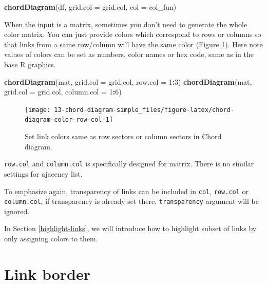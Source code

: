 \documentclass[]{book}
\newenvironment{Shaded}{\begin{snugshade}}{\end{snugshade}}
\newcommand{\KeywordTok}[1]{\textcolor[rgb]{0.13,0.29,0.53}{\textbf{#1}}}
\newcommand{\DataTypeTok}[1]{\textcolor[rgb]{0.13,0.29,0.53}{#1}}
\newcommand{\DecValTok}[1]{\textcolor[rgb]{0.00,0.00,0.81}{#1}}
\newcommand{\OperatorTok}[1]{\textcolor[rgb]{0.81,0.36,0.00}{\textbf{#1}}}
\newcommand{\NormalTok}[1]{#1}
\theoremstyle{definition}
\theoremstyle{definition}
\theoremstyle{remark}
\begin{document}
\begin{Shaded}
\begin{Highlighting}[]
\KeywordTok{chordDiagram}\NormalTok{(df, }\DataTypeTok{grid.col =}\NormalTok{ grid.col, }\DataTypeTok{col =}\NormalTok{ col_fun)}
\end{Highlighting}
\end{Shaded}

When the input is a matrix, sometimes you don't need to generate the
whole color matrix. You can just provide colors which correspond to rows
or columns so that links from a same row/column will have the same color
(Figure \ref{fig:chord-diagram-color-row-col}). Here note values of
colors can be set as numbers, color names or hex code, same as in the
base R graphics.

\begin{Shaded}
\begin{Highlighting}[]
\KeywordTok{chordDiagram}\NormalTok{(mat, }\DataTypeTok{grid.col =}\NormalTok{ grid.col, }\DataTypeTok{row.col =} \DecValTok{1}\OperatorTok{:}\DecValTok{3}\NormalTok{)}
\KeywordTok{chordDiagram}\NormalTok{(mat, }\DataTypeTok{grid.col =}\NormalTok{ grid.col, }\DataTypeTok{column.col =} \DecValTok{1}\OperatorTok{:}\DecValTok{6}\NormalTok{)}
\end{Highlighting}
\end{Shaded}

\begin{figure}

{\centering \texttt{[image: 13-chord-diagram-simple\_files/figure-latex/chord-diagram-color-row-col-1]} 

}

\caption{Set link colors same as row sectors or column sectors in Chord diagram.}\label{fig:chord-diagram-color-row-col}
\end{figure}

\texttt{row.col} and \texttt{column.col} is specifically designed for
matrix. There is no similar settings for ajacency list.

To emphasize again, transparency of links can be included in
\texttt{col}, \texttt{row.col} or \texttt{column.col}, if transparency
is already set there, \texttt{transparency} argument will be ignored.

In Section \ref{highlight-links}, we will introduce how to highlight
subset of links by only assigning colors to them.

\section{Link border}\label{chord-diagram-link-border}
\end{document}

